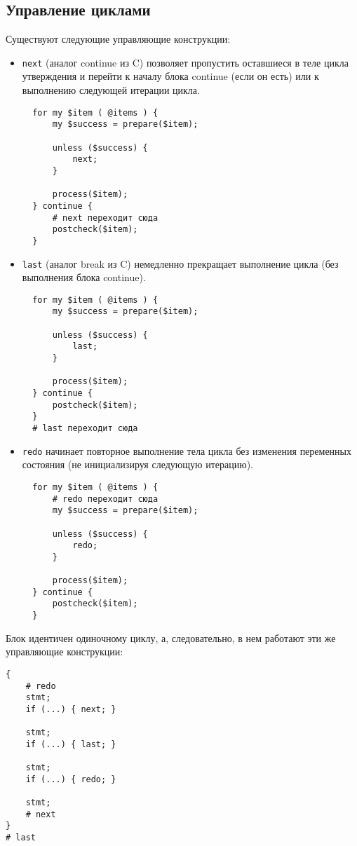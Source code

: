 \subsection{Управление циклами}
Существуют следующие управляющие конструкции:
\begin{itemize}
  \item \verb|next| (аналог continue из C) позволяет пропустить оставшиеся в теле цикла утверждения и перейти к началу блока continue (если он есть) или к выполнению следующей итерации цикла.
  \begin{verbatim}
  for my $item ( @items ) {
      my $success = prepare($item);

      unless ($success) {
          next;
      }

      process($item);
  } continue {
      # next переходит сюда
      postcheck($item);
  }
  \end{verbatim}

  \item \verb|last| (аналог break из C) немедленно прекращает выполнение цикла (без выполнения блока continue).
  \begin{verbatim}
  for my $item ( @items ) {
      my $success = prepare($item);

      unless ($success) {
          last;
      }

      process($item);
  } continue {
      postcheck($item);
  }
  # last переходит сюда
  \end{verbatim}

  \item \verb|redo| начинает повторное выполнение тела цикла без изменения переменных состояния (не инициализируя следующую итерацию).
  \begin{verbatim}
  for my $item ( @items ) {
      # redo переходит сюда
      my $success = prepare($item);

      unless ($success) {
          redo;
      }

      process($item);
  } continue {
      postcheck($item);
  }

  \end{verbatim}
\end{itemize}
Блок идентичен одиночному циклу, а, следовательно, в нем работают эти же управляющие конструкции:
\begin{verbatim}
{
    # redo
    stmt;
    if (...) { next; }

    stmt;
    if (...) { last; }

    stmt;
    if (...) { redo; }

    stmt;
    # next
}
# last
\end{verbatim}

